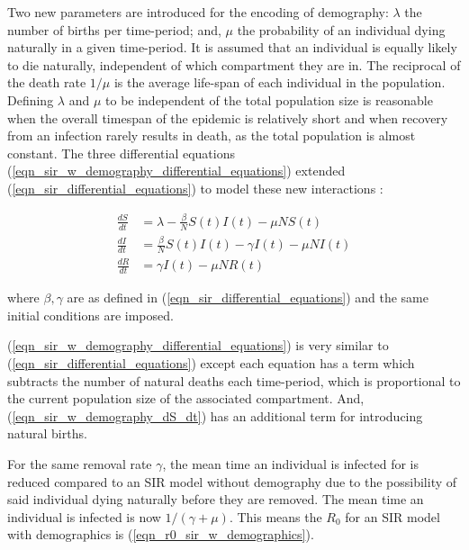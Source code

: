\documentclass[11pt,a4paper]{article}
\theoremstyle{break}
\begin{document}
  \par Two new parameters are introduced for the encoding of demography: $\lambda$ the number of births per time-period; and, $\mu$ the probability of an individual dying naturally in a given time-period. It is assumed that an individual is equally likely to die naturally, independent of which compartment they are in. The reciprocal of the death rate $1/\mu$ is the average life-span of each individual in the population. Defining $\lambda$ and $\mu$ to be independent of the total population size is reasonable when the overall timespan of the epidemic is relatively short and when recovery from an infection rarely results in death, as the total population is almost constant. The three differential equations (\ref{eqn_sir_w_demography_differential_equations}) extended (\ref{eqn_sir_differential_equations}) to model these new interactions \cite[]{application_of_sir_epidemiological_model}:

  \begin{subequations}\label{eqn_sir_w_demography_differential_equations}
    \begin{alignat}{2}
      \frac{dS}{dt}&=\lambda-\frac{\beta}N S(t)I(t)-\mu N S(t)\label{eqn_sir_w_demography_dS_dt}\\
      \frac{dI}{dt}&=\frac{\beta}N S(t)I(t)-\gamma I(t)-\mu N I(t)\\
      \frac{dR}{dt}&=\gamma I(t)-\mu N R(t)
    \end{alignat}
  \end{subequations}

  \noindent where $\beta,\gamma$ are as defined in (\ref{eqn_sir_differential_equations}) and the same initial conditions are imposed.

  \par (\ref{eqn_sir_w_demography_differential_equations}) is very similar to (\ref{eqn_sir_differential_equations}) except each equation has a term which subtracts the number of natural deaths each time-period, which is proportional to the current population size of the associated compartment. And, (\ref{eqn_sir_w_demography_dS_dt}) has an additional term for introducing natural births.

  \par For the same removal rate $\gamma$, the mean time an individual is infected for is reduced compared to an SIR model without demography due to the possibility of said individual dying naturally before they are removed. The mean time an individual is infected is now $1/(\gamma+\mu)$. This means the $R_0$ for an SIR model with demographics is (\ref{eqn_r0_sir_w_demographics}).
\end{document}
